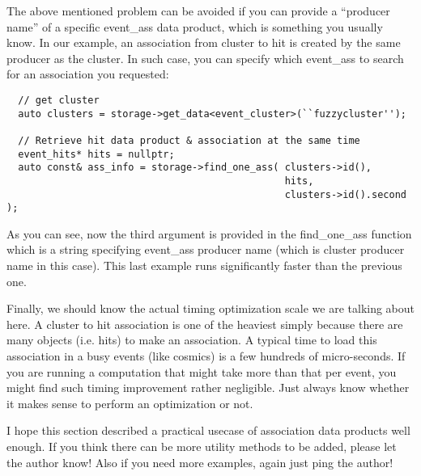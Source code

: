 The above mentioned problem can be avoided if you can provide a ``producer name'' of
a specific {\ttfamily event\_ass} data product, which is something you usually know.
In our example, an association from {\ttfamily cluster} to {\ttfamily hit} is created
by the same producer as the {\ttfamily cluster}. In such case, you can specify which
{\ttfamily event\_ass} to search for an association you requested:
\begin{lstlisting}
  // get cluster
  auto clusters = storage->get_data<event_cluster>(``fuzzycluster''); 

  // Retrieve hit data product & association at the same time
  event_hits* hits = nullptr;
  auto const& ass_info = storage->find_one_ass( clusters->id(),
                                                hits,
                                                clusters->id().second );
\end{lstlisting}
As you can see, now the third argument is provided in the {\ttfamily find\_one\_ass} function
which is a string specifying {\ttfamily event\_ass} producer name (which is {\ttfamily cluster}
producer name in this case). This last example runs significantly faster than the previous one.

Finally, we should know the actual timing optimization scale we are talking about here.
A {\ttfamily cluster} to {\ttfamily hit} association is one of the heaviest simply because
there are many objects (i.e. hits) to make an association. A typical time to load this association
in a busy events (like cosmics) is a few hundreds of micro-seconds. If you are running a
computation that might take more than that per event, you might find such timing improvement
rather negligible. Just always know whether it makes sense to perform an optimization or not.

I hope this section described a practical usecase of association data products well enough.
If you think there can be more utility methods to be added, please let the author know!
Also if you need more examples, again just ping the author!



